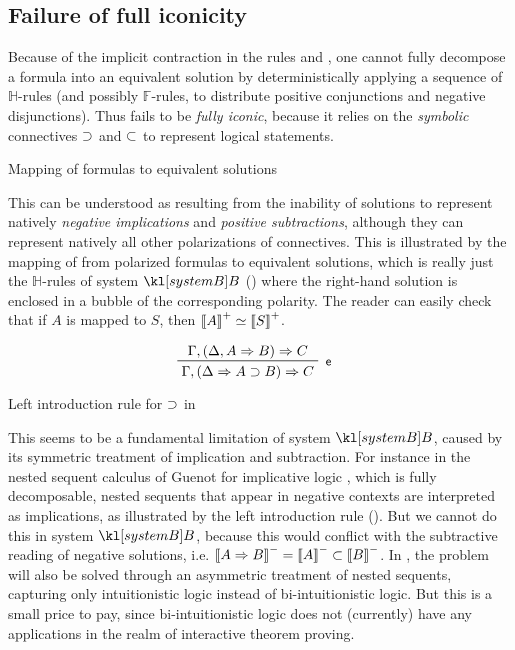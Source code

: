 \subsection{Failure of full iconicity}

Because of the implicit contraction in the rules \rsf{{\limp}{-}} and
\rsf{{\lsub}{+}}, one cannot fully decompose a formula into an equivalent
solution by deterministically applying a sequence of $\mathbb{H}$-rules (and
possibly $\mathbb{F}$-rules, to distribute positive conjunctions and negative
disjunctions). Thus  fails to be \emph{fully iconic}, because it
relies on the \emph{symbolic} connectives $\supset$ and $\subset$ to represent
logical statements.

\begin{marginfigure}
  
  \caption{Mapping of formulas to equivalent solutions}
\end{marginfigure}

This can be understood as resulting from the inability of solutions to represent
natively \emph{negative implications} and \emph{positive subtractions}, although
they can represent natively all other polarizations of connectives. This is
illustrated by the mapping of  from polarized formulas to
equivalent solutions, which is really just the $\mathbb{H}$-rules of system
$\sysB$ () where the right-hand solution is enclosed in a
bubble of the corresponding polarity. The reader can easily check that if $A$ is
mapped to $S$, then $\left\llbracket A \right\rrbracket^+ \simeq \left\llbracket S \right\rrbracket^+$.

\begin{marginfigure}
  $$
  \R[\rsf{e}]
    {\Gamma, (\Delta, A \seq B) \seq C}
    {\Gamma, (\Delta \seq A \limp B) \seq C}
  $$
  \caption{Left introduction rule for $\supset$ in }
\end{marginfigure}

This seems to be a fundamental limitation of system $\sysB$, caused by its
symmetric treatment of implication and subtraction. For instance in the nested
sequent calculus  of Guenot for implicative logic \cite[Chapter
3]{guenot_nested_2013}, which is fully decomposable, nested sequents that appear
in negative contexts are interpreted as implications, as illustrated by the left
introduction rule  (). But we cannot do this in system
$\sysB$, because this would conflict with the subtractive reading of negative
solutions, i.e. $\left\llbracket A \Rightarrow B \right\rrbracket^- = \left\llbracket A \right\rrbracket^- \subset \left\llbracket B \right\rrbracket^-$. In
, the problem will also be solved through an asymmetric treatment
of nested sequents, capturing only intuitionistic logic instead of
bi-intuitionistic logic. But this is a small price to pay, since
bi-intuitionistic logic does not (currently) have any applications in the realm
of interactive theorem proving.